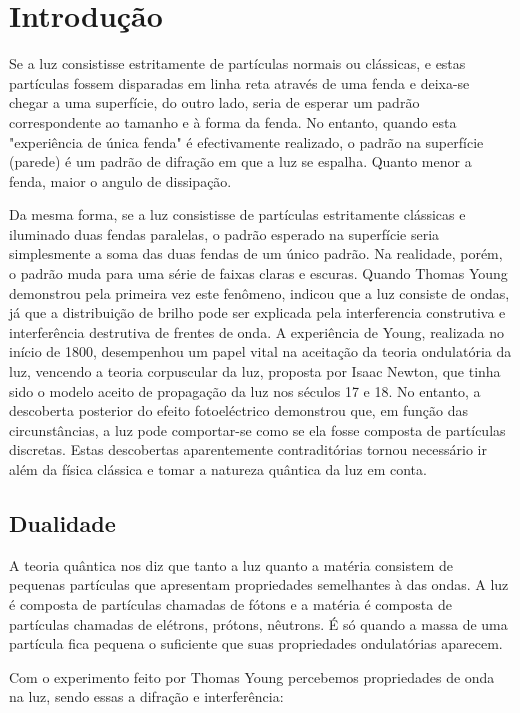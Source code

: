 \section{Introdução}\label{intro}

Se a luz consistisse estritamente de  partículas  normais ou clássicas, e estas partículas fossem disparadas em linha reta através de uma fenda e deixa-se chegar a uma superfície, do outro lado, seria de esperar um padrão correspondente ao tamanho e à forma da fenda. No entanto, quando esta "experiência de única fenda" é efectivamente realizado, o padrão na superfície (parede) é um padrão de difração em que a luz se espalha. Quanto menor a fenda, maior o angulo de dissipação.

Da mesma forma, se a luz consistisse de partículas estritamente clássicas e iluminado duas fendas paralelas, o padrão esperado na superfície seria simplesmente a soma das duas fendas de um único padrão. Na realidade, porém, o padrão muda para uma série de faixas claras e escuras. Quando Thomas Young demonstrou pela primeira vez este fenômeno, indicou que a luz consiste de ondas, já que a distribuição de brilho pode ser explicada pela interferencia construtiva e interferência destrutiva de frentes de onda. A experiência de Young, realizada no início de 1800, desempenhou um papel vital na aceitação da teoria ondulatória da luz, vencendo a teoria corpuscular da luz, proposta por Isaac Newton, que tinha sido o modelo aceito de propagação da luz nos séculos 17 e 18. No entanto, a descoberta posterior do efeito fotoeléctrico demonstrou que, em função das circunstâncias, a luz pode comportar-se como se ela fosse composta de partículas discretas. Estas descobertas aparentemente contraditórias tornou necessário ir além da física clássica e tomar a natureza quântica da luz em conta.

\subsection{Dualidade}\label{dualidade}

A teoria quântica nos diz que tanto a luz quanto a matéria consistem de pequenas partículas que apresentam propriedades semelhantes à das ondas. A luz é composta de partículas chamadas de fótons e a matéria é composta de partículas chamadas de elétrons, prótons, nêutrons. É só quando a massa de uma partícula fica pequena o suficiente que suas propriedades ondulatórias aparecem.

Com o experimento feito por Thomas Young percebemos propriedades de onda na luz, sendo essas a difração e interferência:

